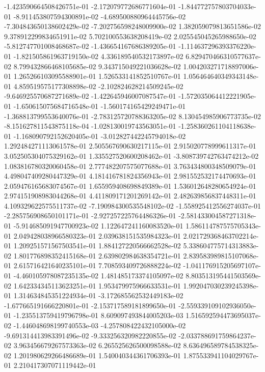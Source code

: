 -1.423590664508426751e-01
-2.172079772686771604e-01
-1.844772757803704033e-01
-8.911453807594300891e-02
-4.689500880964445756e-02
-7.304843650138602429e-02
-7.202756598248009900e-02
1.382059079813651586e-02
9.378912299834651911e-02
5.702100553638208419e-02
2.025545045265988650e-02
-5.812747701008468687e-02
-1.436654167686389205e-01
-1.114637296393376220e-01
-1.821505861963719150e-02
4.336189540532173897e-02
6.829470466310577637e-02
8.799432866468105685e-02
9.343715049221036628e-02
1.004203271718897006e-01
1.265266103095588901e-01
1.526533141852510767e-01
1.056464640349343148e-01
4.859519575177308898e-02
-2.102824628214509245e-02
-9.646925570687271689e-02
-1.422645946007087547e-01
-1.572035064412221905e-01
-1.650615075684716548e-01
-1.560174165429249471e-01
-1.368813799553640076e-01
-2.783125720788363205e-02
8.130454985906773735e-02
-8.151627811543875118e-04
-1.028130019743563051e-01
-1.258360261104118638e-01
-1.168090792152620405e-01
-3.012827442245794018e-02
1.292484271113061578e-01
2.505567690630217115e-01
2.915020778999611317e-01
3.052505304075329162e-01
1.335527520600208462e-01
-3.808739742763474212e-02
1.083816780320060458e-01
2.777482207575077688e-01
3.763434800348509079e-01
4.498047409280447329e-01
4.181416781824356943e-01
2.981552532174470693e-01
2.059476165683074567e-01
1.655959408698849389e-01
1.536012648280654924e-01
2.974151908983044268e-01
4.411809171201269142e-01
2.482639856837448311e-01
4.109329622575511737e-02
-7.190984300535548102e-02
-1.558925412556274037e-01
-2.285756908650101171e-01
-2.927257225764486326e-01
-2.581433004587271318e-01
-5.914685091947700923e-02
1.122647241160083520e-01
1.586114787575705343e-01
2.049428038966580323e-01
2.039638151535984323e-01
2.021729368463702214e-01
1.209251571567503541e-01
1.884127220566662528e-02
5.338604775714313883e-02
1.801776898352415168e-01
2.639802984638354721e-01
2.839583989815107068e-01
2.615716421640235101e-01
7.708593409726888224e-02
-1.041176915205697107e-01
-4.460105978087235135e-02
1.481485173374105097e-02
8.803513195441503569e-02
1.642334345113623251e-01
1.953479975966633531e-01
1.992047030239245398e-01
1.314634845351224934e-01
-3.172685562532449183e-02
-1.677665191666220801e-01
-2.153717589181899650e-01
-2.559339109102936050e-01
-1.235513759419796798e-01
8.609097493844005203e-03
1.516592594473695037e-02
-1.446048698199740553e-03
-4.257808422432105000e-02
-9.691314413983391496e-02
-9.333256320982220855e-02
-2.033788691759864237e-02
3.963456679267573363e-02
6.265525626500098588e-02
8.636496589784538325e-02
1.201980629266486689e-01
1.540040344361706393e-01
1.875533941104029767e-01
2.210417307071119442e-01
